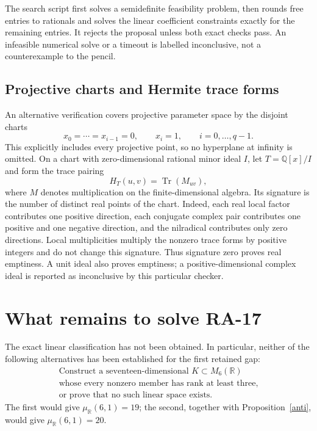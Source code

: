 \documentclass[11pt]{article}
\theoremstyle{remark}\newtheorem{remark}[theorem]{Remark}
\newcommand{\R}{\mathbb R}\newcommand{\C}{\mathbb C}\newcommand{\Q}{\mathbb Q}
\begin{document}
The search script first solves a semidefinite feasibility problem, then
rounds free entries to rationals and solves the linear coefficient constraints
exactly for the remaining entries. It rejects the proposal unless both exact
checks pass. An infeasible numerical solve or a timeout is labelled
inconclusive, not a counterexample to the pencil.

\subsection{Projective charts and Hermite trace forms}
An alternative verification covers projective parameter space by the disjoint
charts
\[
 x_0=\cdots=x_{i-1}=0,\qquad x_i=1,
 \qquad i=0,\ldots,q-1.
\]
This explicitly includes every projective point, so no hyperplane at infinity
is omitted. On a chart with zero-dimensional rational minor ideal $I$, let
$T=\Q[x]/I$ and form the trace pairing
\[
 H_T(u,v)=\operatorname{Tr}(M_{uv}),
\]
where $M$ denotes multiplication on the finite-dimensional algebra.
Its signature is the number of distinct real points of the chart. Indeed,
each real local factor contributes one positive direction, each conjugate
complex pair contributes one positive and one negative direction, and the
nilradical contributes only zero directions. Local multiplicities multiply
the nonzero trace forms by positive integers and do not change this signature.
Thus signature zero proves real emptiness. A unit ideal also proves emptiness;
a positive-dimensional complex ideal is reported as inconclusive by this
particular checker.



\section{What remains to solve RA-17}
The exact linear classification has not been obtained. In particular, neither
of the following alternatives has been established for the first retained gap:
\begin{equation}\label{missing}
 \begin{gathered}
 \text{Construct a seventeen-dimensional }K\subset M_6(\R)\\
 \text{whose every nonzero member has rank at least three,}\\
 \text{or prove that no such linear space exists.}
 \end{gathered}
\end{equation}
The first would give $\mu_\R(6,1)=19$; the second, together with
Proposition~\ref{anti}, would give $\mu_\R(6,1)=20$.
\end{document}
